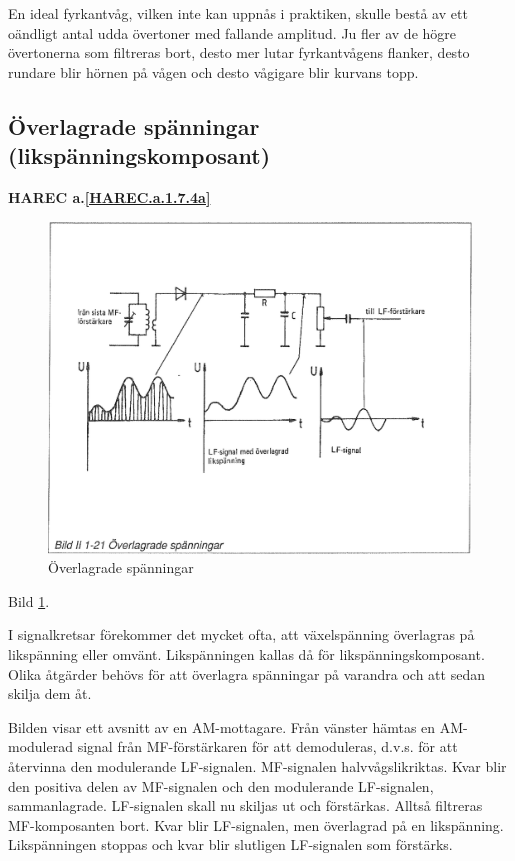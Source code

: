 En ideal fyrkantvåg, vilken inte kan uppnås i praktiken, skulle bestå av ett
oändligt antal udda övertoner med fallande amplitud. Ju fler av de högre
övertonerna som filtreras bort, desto mer lutar fyrkantvågens flanker, desto
rundare blir hörnen på vågen och desto vågigare blir kurvans topp.

\subsection{Överlagrade spänningar
(likspänningskomposant)}
\textbf{HAREC a.\ref{HAREC.a.1.7.4a}\label{myHAREC.a.1.7.4a}}

\begin{figure}
\begin{center}
\includegraphics[width=14cm]{images/bild_2_1-21}
\caption{Överlagrade spänningar}
\label{fig:BildII1-21}
\end{center}
\end{figure}

Bild \ref{fig:BildII1-21}.

I signalkretsar förekommer det mycket ofta, att växelspänning överlagras på likspänning
eller omvänt. Likspänningen kallas då för likspänningskomposant. Olika åtgärder behövs för
att överlagra spänningar på varandra och att sedan skilja dem åt.

Bilden visar ett avsnitt av en AM-mottagare. Från vänster hämtas en AM-modulerad signal
från MF-förstärkaren för att demoduleras, d.v.s. för att återvinna den modulerande
LF-signalen. MF-signalen halvvågslikriktas. Kvar blir den positiva delen av MF-signalen
och den modulerande LF-signalen, sammanlagrade. LF-signalen skall nu skiljas ut och
förstärkas. Alltså filtreras MF-komposanten bort. Kvar blir LF-signalen, men överlagrad på
en likspänning. Likspänningen stoppas och kvar blir slutligen LF-signalen som förstärks.
